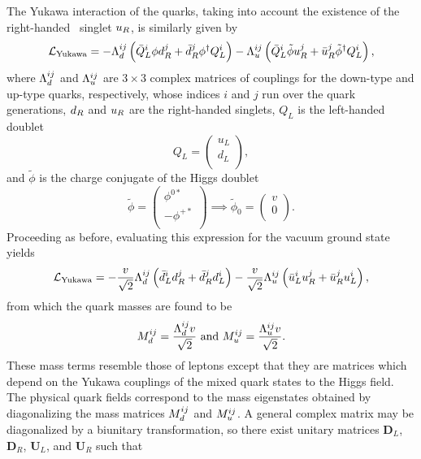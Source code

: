 The Yukawa interaction of the quarks, taking into account the existence of the right-handed \symWEAK\ singlet $u_{R}$, is similarly given by
\begin{equation}
  \mathcal{L}_{\mathrm{Yukawa}} = -\Lambda_{d}^{ij} \left( \bar{Q}_{L}^{i} \phi d_{R}^{j} + \bar{d}_{R}^{j} \phi^{\dag} Q_{L}^{i} \right) -\Lambda_{u}^{ij} \left( \bar{Q}_{L}^{i} \tilde{\phi} u_{R}^{j} + \bar{u}_{R}^{j} \tilde{\phi}^{\dag} Q_{L}^{i} \right),
\end{equation}
where $\Lambda_{d}^{ij}$ and $\Lambda_{u}^{ij}$ are $3 \times 3$ complex matrices of couplings for the down-type and up-type quarks, respectively, whose indices $i$ and $j$ run over the quark generations, $d_{R}$ and $u_{R}$ are the right-handed singlets, $Q_{L}$ is the left-handed doublet
\begin{equation}
  Q_{L} = \begin{pmatrix} u_{L} \\ d_{L} \\ \end{pmatrix},
\end{equation}
and $\tilde{\phi}$ is the charge conjugate of the Higgs doublet
\begin{equation}
  \tilde{\phi} = \begin{pmatrix} \phi^{0*} \\ -\phi^{+*} \\ \end{pmatrix} \implies \tilde{\phi}_{0} = \begin{pmatrix} v \\ 0 \\ \end{pmatrix}.
\end{equation}
Proceeding as before, evaluating this expression for the vacuum ground state yields
\begin{equation}
  \mathcal{L}_{\mathrm{Yukawa}} = -\frac{v}{\sqrt{2}} \Lambda_{d}^{ij} \left( \bar{d}_{L}^{i} d_{R}^{j} + \bar{d}_{R}^{j} d_{L}^{i} \right) -\frac{v}{\sqrt{2}} \Lambda_{u}^{ij} \left( \bar{u}_{L}^{i}u_{R}^{j} + \bar{u}_{R}^{j} u_{L}^{i} \right),
\end{equation}
from which the quark masses are found to be
\begin{equation}
  M_{d}^{ij} = \frac{\Lambda_{d}^{ij}v}{\sqrt{2}}\ \mathrm{and}\ M_{u}^{ij} = \frac{\Lambda_{u}^{ij}v}{\sqrt{2}}.
\end{equation}
These mass terms resemble those of leptons except that they are matrices which depend on the Yukawa couplings of the mixed quark states to the Higgs field. The physical quark fields correspond to the mass eigenstates obtained by diagonalizing the mass matrices $M_{d}^{ij}$ and $M_{u}^{ij}$. A general complex matrix may be diagonalized by a biunitary transformation, so there exist unitary matrices $\mathbf{D}_{L}$, $\mathbf{D}_{R}$, $\mathbf{U}_{L}$, and $\mathbf{U}_{R}$ such that
